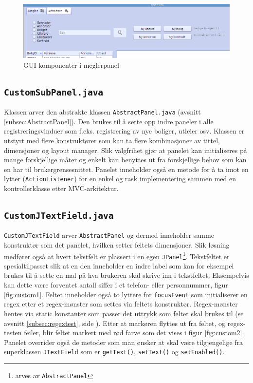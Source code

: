 \begin{figure}[ht]
 \includegraphics[width=\textwidth,height=\textheight,keepaspectratio]{./img/produktdokumentasjon/swing_componenter/megler_panel.png}
 \caption{GUI komponenter i meglerpanel}
 \label{fig:megler_panel}
\end{figure}




\subsection{\texttt{CustomSubPanel.java}}
Klassen arver den abstrakte klassen \texttt{AbstractPanel.java} (avsnitt \ref{subsec:AbstractPanel}). Den brukes til å sette opp indre paneler i alle registreringsvinduer som f.eks. registrering av nye boliger, utleier osv. Klassen er utstyrt med flere konstruktører som kan ta flere kombinasjoner av tittel, dimensjoner og layout manager. Slik valgfrihet gjør at panelet kan initialiseres på mange forskjellige måter og enkelt kan benyttes ut fra forskjellige behov som kan en har til brukergrensesnittet. Panelet inneholder også en metode for å ta imot en lytter (\texttt{ActionListener}) for en enkel og rask implementering sammen med en kontrollerklasse etter MVC-arkitektur.








\subsection{\texttt{CustomJTextField.java}}
\texttt{CustomJTextField} arver \texttt{AbstractPanel} og dermed inneholder samme konstruktør som det panelet, hvilken setter feltets dimensjoner. Slik løsning medfører også at hvert tekstfelt er plassert i en egen \texttt{JPanel}\footnote{arves av \texttt{AbstractPanel}}.
Tekstfeltet er spesialtilpasset slik at en den inneholder en indre label som kan for eksempel brukes til å sette en mal på hva brukeren skal skrive inn i tekstfeltet. Eksempelvis kan dette være forventet antall siffer i et telefon- eller personnummer, figur \ref{fig:custom1}. Feltet inneholder også to lyttere for \texttt{focusEvent} som initialiserer en regex etter et regex-mønster som settes via feltets konstruktør. Regex-mønster hentes via static konstanter som passer det uttrykk som feltet skal brukes til (se avsnitt \ref{subsec:regextest}, side \pageref{subsec:regextest}). Etter at markøren flyttes ut fra feltet, og regex-testen feiler, blir feltet markert med rød farve som det vises i figur \ref{fig:custom2}.
Panelet overrider også de metoder som man ønsker at skal være tilgjengelige fra superklassen \texttt{JTextField} som er \texttt{getText()}, \texttt{setText()} og \texttt{setEnabled()}.

